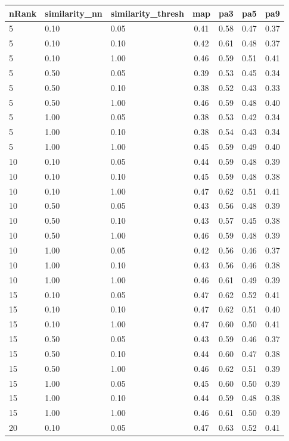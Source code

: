 \begin{tabular}{lllcccc} 
nRank & similarity\_nn & similarity\_thresh & map & pa3 & pa5 & pa9 \\ 
\hline 
 5 & 0.10 & 0.05 & 0.41 & 0.58 & 0.47 & 0.37 \\ 
 5 & 0.10 & 0.10 & 0.42 & 0.61 & 0.48 & 0.37 \\ 
 5 & 0.10 & 1.00 & 0.46 & 0.59 & 0.51 & 0.41 \\ 
 5 & 0.50 & 0.05 & 0.39 & 0.53 & 0.45 & 0.34 \\ 
 5 & 0.50 & 0.10 & 0.38 & 0.52 & 0.43 & 0.33 \\ 
 5 & 0.50 & 1.00 & 0.46 & 0.59 & 0.48 & 0.40 \\ 
 5 & 1.00 & 0.05 & 0.38 & 0.53 & 0.42 & 0.34 \\ 
 5 & 1.00 & 0.10 & 0.38 & 0.54 & 0.43 & 0.34 \\ 
 5 & 1.00 & 1.00 & 0.45 & 0.59 & 0.49 & 0.40 \\ 
10 & 0.10 & 0.05 & 0.44 & 0.59 & 0.48 & 0.39 \\ 
10 & 0.10 & 0.10 & 0.45 & 0.59 & 0.48 & 0.38 \\ 
10 & 0.10 & 1.00 & 0.47 & 0.62 & 0.51 & 0.41 \\ 
10 & 0.50 & 0.05 & 0.43 & 0.56 & 0.48 & 0.39 \\ 
10 & 0.50 & 0.10 & 0.43 & 0.57 & 0.45 & 0.38 \\ 
10 & 0.50 & 1.00 & 0.46 & 0.59 & 0.48 & 0.39 \\ 
10 & 1.00 & 0.05 & 0.42 & 0.56 & 0.46 & 0.37 \\ 
10 & 1.00 & 0.10 & 0.43 & 0.56 & 0.46 & 0.38 \\ 
10 & 1.00 & 1.00 & 0.46 & 0.61 & 0.49 & 0.39 \\ 
15 & 0.10 & 0.05 & 0.47 & 0.62 & 0.52 & 0.41 \\ 
15 & 0.10 & 0.10 & 0.47 & 0.62 & 0.51 & 0.40 \\ 
15 & 0.10 & 1.00 & 0.47 & 0.60 & 0.50 & 0.41 \\ 
15 & 0.50 & 0.05 & 0.43 & 0.59 & 0.46 & 0.37 \\ 
15 & 0.50 & 0.10 & 0.44 & 0.60 & 0.47 & 0.38 \\ 
15 & 0.50 & 1.00 & 0.46 & 0.62 & 0.51 & 0.39 \\ 
15 & 1.00 & 0.05 & 0.45 & 0.60 & 0.50 & 0.39 \\ 
15 & 1.00 & 0.10 & 0.44 & 0.59 & 0.48 & 0.38 \\ 
15 & 1.00 & 1.00 & 0.46 & 0.61 & 0.50 & 0.39 \\ 
20 & 0.10 & 0.05 & 0.47 & 0.63 & 0.52 & 0.41 \\ 

\end{tabular}
